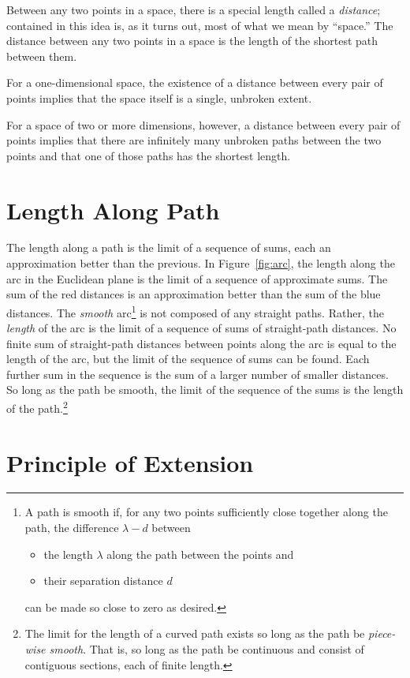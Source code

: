 Between any two points in a space, there is a special length called a
\emph{distance}; contained in this idea is, as it turns out, most of what we
mean by ``space.'' The distance between any two points in a space is the length
of the shortest path between them.

For a one-dimensional space, the existence of a distance between every pair of
points implies that the space itself is a single, unbroken extent.

For a space of two or more dimensions, however, a distance between every pair
of points implies that there are infinitely many unbroken paths between the two
points and that one of those paths has the shortest length.

\section{Length Along Path}

The length along a path is the limit of a sequence of sums, each an
approximation better than the previous.  In Figure~\ref{fig:arc}, the length
along the arc in the Euclidean plane is the limit of a sequence of approximate
sums.  The sum of the red distances is an approximation better than the sum of
the blue distances.  The \emph{smooth} arc\footnote{%
   A path is smooth if, for any two points sufficiently close together along
   the path, the difference $\lambda - d$ between
   \begin{itemize}[noitemsep]
      \item the length $\lambda$ along the path between the points and
      \item their separation distance $d$
   \end{itemize}
   can be made so close to zero as desired.%
}
is not composed of any straight paths.  Rather, the \emph{length} of the arc is
the limit of a sequence of sums of straight-path distances.  No finite sum of
straight-path distances between points along the arc is equal to the length of
the arc, but the limit of the sequence of sums can be found.  Each further sum
in the sequence is the sum of a larger number of smaller distances.  So long as
the path be smooth, the limit of the sequence of the sums is the length of the
path.\footnote{%
   The limit for the length of a curved path exists so long as the path be
   \emph{piece-wise smooth}.  That is, so long as the path be continuous and
   consist of contiguous sections, each of finite length.%
}

\section{Principle of Extension}

